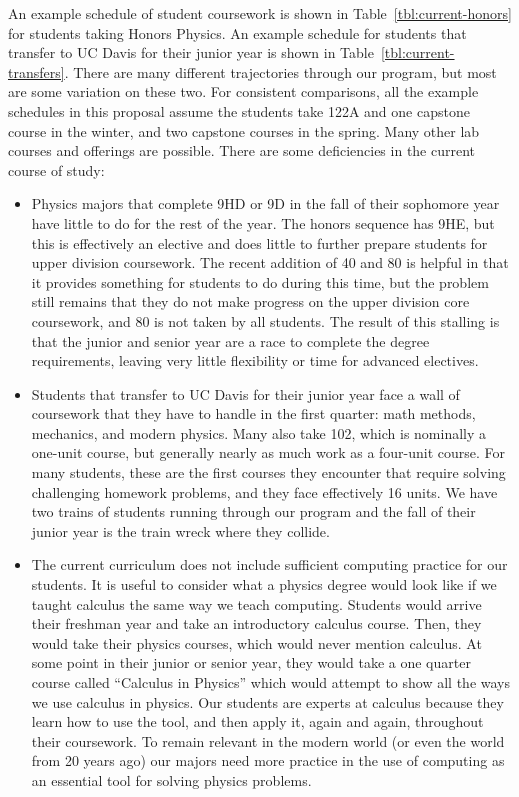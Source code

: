 \documentclass[12pt]{article}
\begin{document}
An example schedule of student coursework is shown in Table~\ref{tbl:current-honors} for students taking Honors Physics.  An example schedule for students that transfer to UC Davis for their junior year is shown in Table~\ref{tbl:current-transfers}.  There are many different trajectories through our program, but most are some variation on these two.  
For consistent comparisons, all the example schedules in this proposal assume the students take 122A and one capstone course in the winter, and two capstone courses in the spring.  Many other lab courses and offerings are possible. There are some deficiencies in the current course of study:
\begin{itemize}
\item Physics majors that complete 9HD or 9D in the fall of their sophomore year have little to do for the rest of the year.  The honors sequence has 9HE, but this is effectively an elective and does little to further prepare students for upper division coursework.  The recent addition of 40 and 80 is helpful in that it provides something for students to do during this time, but the problem still remains that they do not make progress on the upper division core coursework, and 80 is not taken by all students.  The result of this stalling is that the junior and senior year are a race to complete the degree requirements, leaving very little flexibility or time for advanced electives.

\item Students that transfer to UC Davis for their junior year face a wall of coursework that they have to handle in the first quarter: math methods, mechanics, and modern physics.  Many also take 102, which is nominally a one-unit course, but generally nearly as much work as a four-unit course.  For many students, these are the first courses they encounter that require solving challenging homework problems, and they face effectively 16 units.  We have two trains of students running through our program and the fall of their junior year is the train wreck where they collide.

\item The current curriculum does not include sufficient computing practice for our students.  It is useful to consider what a physics degree would look like if we taught calculus the same way we teach computing.  Students would arrive their freshman year and take an introductory calculus course.  Then, they would take their physics courses, which would never mention calculus.  At some point in their junior or senior year, they would take a one quarter course called ``Calculus in Physics'' which would attempt to show all the ways we use calculus in physics.  Our students are experts at calculus because they learn how to use the tool, and then apply it, again and again, throughout their coursework.  To remain relevant in the modern world (or even the world from 20 years ago) our majors need more practice in the use of computing as an essential tool for solving physics problems.


\end{itemize}
\end{document}
